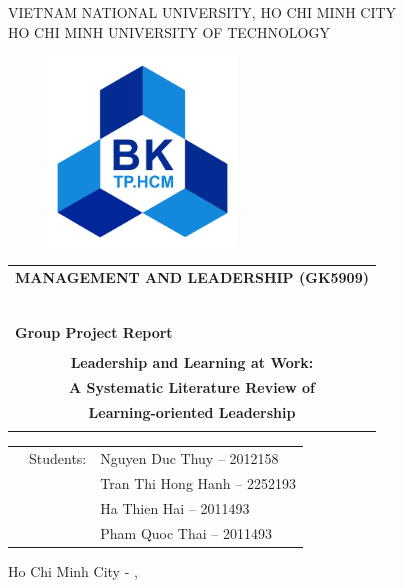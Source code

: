 \begin{titlepage}
\begin{center}
VIETNAM NATIONAL UNIVERSITY, HO CHI MINH CITY \\
HO CHI MINH UNIVERSITY OF TECHNOLOGY \\
\end{center}

\vspace{1cm}

\begin{figure}[h!]
\begin{center}
\includegraphics[width=5cm]{images/hcmut.png}
\end{center}
\end{figure}

\vspace{1cm}


\begin{center}
\begin{tabular}{c}
\multicolumn{1}{l}{\textbf{{\Large MANAGEMENT AND LEADERSHIP (GK5909)}}}\\
~~\\
\hline
\\
\multicolumn{1}{l}{\textbf{{\Large Group Project Report}}}\\
\\
\textbf{{\Huge Leadership and Learning at Work:}}\\
\textbf{{\Huge A Systematic Literature Review of}}\\
\textbf{{\Huge Learning-oriented Leadership}}\\
\\
\hline
\end{tabular}
\end{center}

\vspace{1.5cm}

\begin{table}[h]
\begin{tabular}{rrl}
\hspace{5 cm} & Students: & Nguyen Duc Thuy     -- 2012158 \\
              &           & Tran Thi Hong Hanh  -- 2252193 \\
              &           & Ha Thien Hai        -- 2011493 \\
              &           & Pham Quoc Thai      -- 2011493


\end{tabular}
\end{table}
\vspace{1.5cm}
\begin{center}
{\footnotesize Ho Chi Minh City - \monthname[\the\month], \the\year}
\end{center}
\end{titlepage}
    